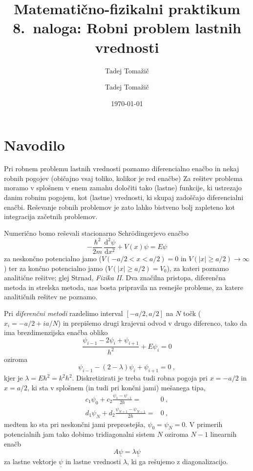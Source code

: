 \documentclass[slovene,11pt,a4paper]{article}
\title{
\sc\large Matematično-fizikalni praktikum \thisyear \\
\bigskip
\bf\Large 8.~naloga: Robni problem lastnih vrednosti
}
\author{Tadej Tomažič}
\date{}
\newcommand{\ddd}{\mathrm{d}}
\newcommand{\Dd}[3][{}]{\frac{\ddd^{#1} #2}{\ddd #3^{#1}}}
\begin{document}
\author{Tadej Tomažič}
\date{\today}

\maketitle

\newpage
{}
\tableofcontents
\listoffigures
\newpage
\vspace{-1cm}
\section{Navodilo}
Pri robnem problemu lastnih vrednosti poznamo diferencialno enačbo
in nekaj robnih pogojev (običajno vsaj toliko, kolikor je red enačbe)
Za rešitev problema moramo v splošnem v enem zamahu določiti
tako (lastne) funkcije, ki ustrezajo danim robnim pogojem,
kot (lastne) vrednosti, ki skupaj zadoščajo diferencialni enačbi.
Reševanje robnih problemov je zato lahko bistveno bolj zapleteno
kot integracija začetnih problemov.


Numerično bomo reševali stacionarno Schr\"odingerjevo enačbo
\begin{equation*}
-\frac{\hbar^2}{2m}\,\Dd[2]{\psi}{x} + V(x)\psi = E\psi  
\end{equation*}
za neskončno potencialno jamo ($V(-a/2 < x < a/2)=0$ 
in $V(|x|\ge a/2)\to\infty$) ter za končno potencialno jamo
($V(|x|\ge a/2)=V_0$), za kateri poznamo analitične rešitve;
glej Strnad, {\sl Fizika II\/}.  Dva značilna pristopa, diferenčna
metoda in strelska metoda, nas bosta pripravila na resnejše probleme,
za katere analitičnih rešitev ne poznamo.

Pri {\sl diferenčni metodi\/} razdelimo interval
$[-a/2,a/2]$ na $N$ točk ($x_i = -a/2 + ia/N$) in prepišemo drugi
krajevni odvod v drugo diferenco, tako da ima brezdimenzijska enačba obliko
\begin{equation*}
\frac{\psi_{i-1} - 2\psi_i + \psi_{i+1}}{h^2} + E\psi_i = 0  
\end{equation*}
oziroma
\begin{equation*}
\psi_{i-1} - (2-\lambda)\psi_i + \psi_{i+1} = 0 \>,  
\end{equation*}
kjer je $\lambda=Eh^2=k^2h^2$.  Diskretizirati je treba tudi robna
pogoja pri $x=-a/2$ in $x=a/2$, ki sta v splošnem (in tudi
pri končni jami) mešanega tipa,
\begin{align*}
c_1 \psi_0 + c_2 \frac{\psi_1 - \psi_{-1}}{2h} =& 0 \>, \\
d_1 \psi_N + d_2 \frac{\psi_{N+1} - \psi_{N-1}}{2h} =& 0 \>,
\end{align*}
medtem ko sta pri neskončni jami preprostejša, $\psi_0=\psi_N=0$.
V primerih potencialnih jam tako dobimo tridiagonalni sistem $N$
oziroma $N-1$ linearnih enačb
\begin{equation*}
A \underline{\psi} = \lambda \underline{\psi}   
\end{equation*}
za lastne vektorje $\underline{\psi}$ in lastne vrednosti $\lambda$,
ki ga rešujemo z diagonalizacijo.  
\end{document}
